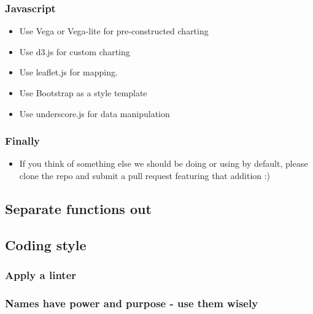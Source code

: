 \documentclass[]{book}
\providecommand{\tightlist}{%
  \setlength{\itemsep}{0pt}\setlength{\parskip}{0pt}}
\begin{document}
\hypertarget{javascript}{%
\subsubsection*{Javascript}\label{javascript}}

\begin{itemize}
\tightlist
\item
  Use Vega or Vega-lite for pre-constructed charting
\item
  Use d3.js for custom charting
\item
  Use leaflet.js for mapping.
\item
  Use Bootstrap as a style template
\item
  Use underscore.js for data manipulation
\end{itemize}

\hypertarget{finally}{%
\subsubsection*{Finally}\label{finally}}

\begin{itemize}
\tightlist
\item
  If you think of something else we should be doing or using by default, please clone the repo and submit a pull request featuring that addition :)
\end{itemize}

\hypertarget{functions}{%
\subsection{Separate functions out}\label{functions}}

\hypertarget{style}{%
\subsection{Coding style}\label{style}}

\hypertarget{linter}{%
\subsubsection{Apply a linter}\label{linter}}

\hypertarget{names}{%
\subsubsection{Names have power and purpose - use them wisely}\label{names}}
\end{document}
